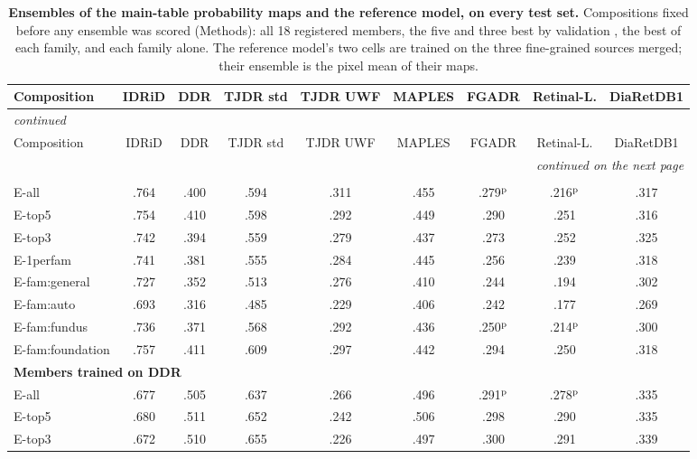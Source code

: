 
{\scriptsize\setlength{\tabcolsep}{3.2pt}\setlength{\LTcapwidth}{\textwidth}\renewcommand{\arraystretch}{1.08}
\begin{longtable}{l c c c c c c c c }
\caption{\textbf{Ensembles of the main-table probability maps and the reference model, \mAUPR{} on every test set.} Compositions fixed before any ensemble was scored (Methods): all 18 registered members, the five and three best by validation \mAUPR{}, the best of each family, and each family alone. The reference model's two cells are trained on the three fine-grained sources merged; their ensemble is the pixel mean of their maps.}\label{stab:ensembles}\\
\toprule
Composition & IDRiD & DDR & TJDR std & TJDR UWF & MAPLES & FGADR & Retinal-L. & DiaRetDB1 \\
\midrule
\endfirsthead
\multicolumn{9}{l}{\textit{continued}}\\
\toprule
Composition & IDRiD & DDR & TJDR std & TJDR UWF & MAPLES & FGADR & Retinal-L. & DiaRetDB1 \\
\midrule
\endhead
\midrule
\multicolumn{9}{r}{\textit{continued on the next page}}\\
\endfoot
\bottomrule
\endlastfoot
\multicolumn{9}{l}{\textbf{Members trained on IDRiD}}\\
E-all & .764 & .400 & .594 & .311 & .455 & .279$^{\rm p}$ & .216$^{\rm p}$ & .317 \\
E-top5 & .754 & .410 & .598 & .292 & .449 & .290 & .251 & .316 \\
E-top3 & .742 & .394 & .559 & .279 & .437 & .273 & .252 & .325 \\
E-1perfam & .741 & .381 & .555 & .284 & .445 & .256 & .239 & .318 \\
E-fam:general & .727 & .352 & .513 & .276 & .410 & .244 & .194 & .302 \\
E-fam:auto & .693 & .316 & .485 & .229 & .406 & .242 & .177 & .269 \\
E-fam:fundus & .736 & .371 & .568 & .292 & .436 & .250$^{\rm p}$ & .214$^{\rm p}$ & .300 \\
E-fam:foundation & .757 & .411 & .609 & .297 & .442 & .294 & .250 & .318 \\
\multicolumn{9}{l}{\textbf{Members trained on DDR}}\\
E-all & .677 & .505 & .637 & .266 & .496 & .291$^{\rm p}$ & .278$^{\rm p}$ & .335 \\
E-top5 & .680 & .511 & .652 & .242 & .506 & .298 & .290 & .335 \\
E-top3 & .672 & .510 & .655 & .226 & .497 & .300 & .291 & .339 \\

\end{longtable}}
